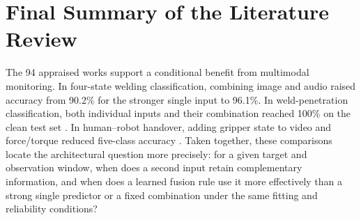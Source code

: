 \section{Final Summary of the Literature Review}

The 94 appraised works support a conditional benefit from multimodal monitoring. In four-state welding classification, combining image and audio raised accuracy from 90.2\% for the stronger single input to 96.1\%. In weld-penetration classification, both individual inputs and their combination reached 100\% on the clean test set \parencite{P003,Hua2026Weld}. In human--robot handover, adding gripper state to video and force/torque reduced five-class accuracy \parencite{Thoduka2024Handover}. Taken together, these comparisons locate the architectural question more precisely: for a given target and observation window, when does a second input retain complementary information, and when does a learned fusion rule use it more effectively than a strong single predictor or a fixed combination under the same fitting and reliability conditions?

\ReviewFollowupTable
